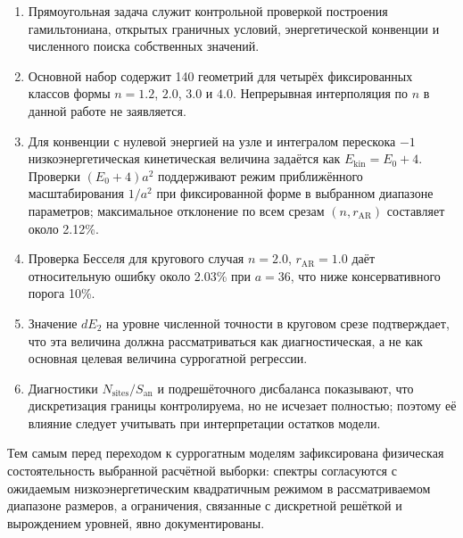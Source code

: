 \begin{enumerate}
  \item Прямоугольная задача служит контрольной проверкой построения гамильтониана,
  открытых граничных условий, энергетической конвенции и численного поиска собственных
  значений.
  \item Основной набор содержит 140 геометрий для четырёх фиксированных классов формы
  $n=1.2$, $2.0$, $3.0$ и $4.0$. Непрерывная интерполяция по $n$ в данной работе не
  заявляется.
  \item Для конвенции с нулевой энергией на узле и интегралом перескока $-1$
  низкоэнергетическая кинетическая величина задаётся как $E_{\mathrm{kin}}=E_0+4$.
  Проверки $(E_0+4)a^2$ поддерживают режим приближённого масштабирования $1/a^2$ при
  фиксированной форме в выбранном диапазоне параметров; максимальное отклонение по всем
  срезам $(n,r_{\mathrm{AR}})$ составляет около 2.12\%.
  \item Проверка Бесселя для кругового случая $n=2.0$, $r_{\mathrm{AR}}=1.0$ даёт
  относительную ошибку около 2.03\% при $a=36$, что ниже консервативного порога 10\%.
  \item Значение $dE_2$ на уровне численной точности в круговом срезе подтверждает, что
  эта величина должна рассматриваться как диагностическая, а не как основная целевая
  величина суррогатной регрессии.
  \item Диагностики $N_{\mathrm{sites}}/S_{\mathrm{an}}$ и подрешёточного дисбаланса
  показывают, что дискретизация границы контролируема, но не исчезает полностью; поэтому
  её влияние следует учитывать при интерпретации остатков модели.
\end{enumerate}

Тем самым перед переходом к суррогатным моделям зафиксирована физическая состоятельность
выбранной расчётной выборки: спектры согласуются с ожидаемым низкоэнергетическим
квадратичным режимом в рассматриваемом диапазоне размеров, а ограничения, связанные с
дискретной решёткой и вырождением уровней, явно документированы.

\clearpage
